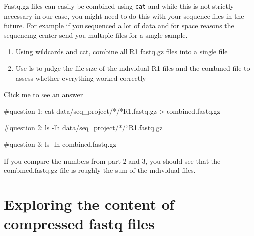\documentclass[
  letterpaper,
  DIV=11,
  numbers=noendperiod]{scrreprt}
\newenvironment{Shaded}{}{}
\newcommand{\AttributeTok}[1]{\textcolor[rgb]{0.84,0.23,0.29}{#1}}
\newcommand{\CommentTok}[1]{\textcolor[rgb]{0.42,0.45,0.49}{#1}}
\newcommand{\FunctionTok}[1]{\textcolor[rgb]{0.44,0.26,0.76}{#1}}
\newcommand{\NormalTok}[1]{\textcolor[rgb]{0.14,0.16,0.18}{#1}}
\newcommand{\OperatorTok}[1]{\textcolor[rgb]{0.14,0.16,0.18}{#1}}
\newcommand{\PreprocessorTok}[1]{\textcolor[rgb]{0.84,0.23,0.29}{#1}}
\providecommand{\tightlist}{%
  \setlength{\itemsep}{0pt}\setlength{\parskip}{0pt}}\usepackage{longtable,booktabs,array}
\begin{document}
\begin{tcolorbox}[enhanced jigsaw, bottomtitle=1mm, colframe=quarto-callout-caution-color-frame, left=2mm, leftrule=.75mm, coltitle=black, colbacktitle=quarto-callout-caution-color!10!white, toprule=.15mm, rightrule=.15mm, opacityback=0, titlerule=0mm, colback=white, breakable, bottomrule=.15mm, title=\textcolor{quarto-callout-caution-color}{\faFire}\hspace{0.5em}{Exercise}, arc=.35mm, toptitle=1mm, opacitybacktitle=0.6]

Fastq.gz files can easily be combined using \texttt{cat} and while this
is not strictly necessary in our case, you might need to do this with
your sequence files in the future. For example if you sequenced a lot of
data and for space reasons the sequencing center send you multiple files
for a single sample.

\begin{enumerate}
\def\labelenumi{\arabic{enumi}.}
\tightlist
\item
  Using wildcards and cat, combine all R1 fastq.gz files into a single
  file
\item
  Use ls to judge the file size of the individual R1 files and the
  combined file to assess whether everything worked correctly
\end{enumerate}

Click me to see an answer

\begin{Shaded}
\begin{Highlighting}[]
\CommentTok{\#question 1:}
\FunctionTok{cat}\NormalTok{ data/seq\_project/}\PreprocessorTok{*}\NormalTok{/}\PreprocessorTok{*}\NormalTok{R1.fastq.gz }\OperatorTok{\textgreater{}}\NormalTok{ combined.fastq.gz}

\CommentTok{\#question 2:}
\FunctionTok{ls} \AttributeTok{{-}lh}\NormalTok{ data/seq\_project/}\PreprocessorTok{*}\NormalTok{/}\PreprocessorTok{*}\NormalTok{R1.fastq.gz}

\CommentTok{\#question 3: }
\FunctionTok{ls} \AttributeTok{{-}lh}\NormalTok{ combined.fastq.gz}
\end{Highlighting}
\end{Shaded}

If you compare the numbers from part 2 and 3, you should see that the
combined.fastq.gz file is roughly the sum of the individual files.

\end{tcolorbox}

\section{Exploring the content of compressed fastq
files}\label{exploring-the-content-of-compressed-fastq-files}
\end{document}
